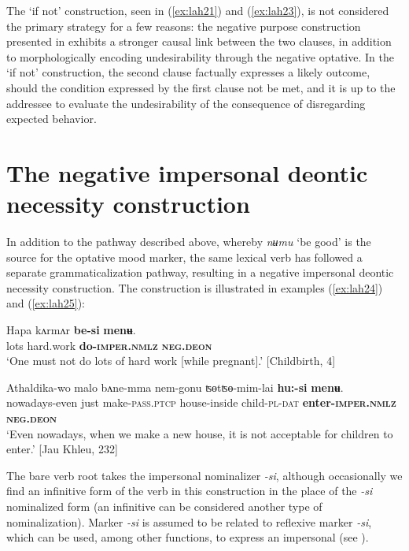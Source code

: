 \documentclass[output=paper,colorlinks,citecolor=brown,
]{langscibook}
\begin{document}
The `if not' construction, seen in (\ref{ex:lah21}) and (\ref{ex:lah23}), is not considered the primary strategy for a few reasons: the negative purpose construction presented in  exhibits a stronger causal link between the two clauses, in addition to morphologically encoding undesirability through the negative optative. In the `if not' construction, the second clause factually expresses a likely outcome, should the condition expressed by the first clause not be met, and it is up to the addressee to evaluate the undesirability of the consequence of disregarding expected behavior.





\section{The negative impersonal deontic necessity construction}
\label{sec:negimp}

In addition to the pathway described above, whereby \textit{nʉmu} `be good' is the source for the optative mood marker, the same lexical verb has followed a separate grammaticalization pathway, resulting in a negative impersonal deontic necessity construction. The construction is illustrated in examples (\ref{ex:lah24}) and (\ref{ex:lah25}):


\ea \label{ex:lah24}
\gll Hapa kʌrmʌr \textbf{be-si} \textbf{menʉ}. \\
lots hard.work \textbf{do\textsc{-imper.nmlz}} \textbf{\textsc{neg.deon}} \\
\glt `One must not do lots of hard work [while pregnant].' [Childbirth, 4]
\z


\ea \label{ex:lah25}
\gll Athaldika-wo malo bʌne-mma nem-gonu ʦɵtʦɵ-mim-lai \textbf{hu:-si} \textbf{menʉ}. \\
nowadays-even just make-\textsc{pass.ptcp} house-inside child-\textsc{pl-dat} \textbf{enter-\textsc{imper.nmlz}} \textbf{\textsc{neg.deon}} \\
\glt `Even nowadays, when we make a new house, it is not acceptable for children to enter.' [Jau Khleu, 232]
\z

\noindent The bare verb root takes the impersonal nominalizer \textit{-si}, although occasionally we find an infinitive form of the verb in this construction in the place of the \textit{-si} nominalized form (an infinitive can be considered another type of nominalization). Marker \textit{-si} is assumed to be related to reflexive marker \textit{-si}, which can be used, among other functions, to express an impersonal (see \citealt{Lahaussois2016,Lahaussois2023}).
\end{document}
